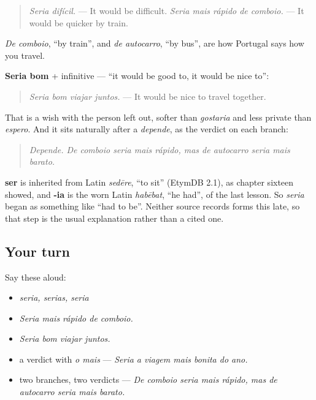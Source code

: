 \begin{quote}
\emph{Seria difícil.} — It would be difficult. \emph{Seria mais rápido de comboio.} — It would be quicker by train.
\end{quote}

\emph{De comboio}, \textquotedblleft{}by train\textquotedblright{}, and \emph{de autocarro}, \textquotedblleft{}by bus\textquotedblright{}, are how Portugal says how you travel.

\begin{grammarlens}[title={Grammar Lens: seria bom}]
\textbf{Seria bom} + infinitive — \textquotedblleft{}it would be good to, it would be nice to\textquotedblright{}:

\begin{quote}
\emph{Seria bom viajar juntos.} — It would be nice to travel together.
\end{quote}

That is a wish with the person left out, softer than \emph{gostaria} and less private than \emph{espero}. And it sits naturally after a \emph{depende}, as the verdict on each branch:

\begin{quote}
\emph{Depende. De comboio seria mais rápido, mas de autocarro seria mais barato.}
\end{quote}
\end{grammarlens}

\begin{cousinweb}
\textbf{ser} is inherited from Latin \emph{sedēre}, \textquotedblleft{}to sit\textquotedblright{} (EtymDB 2.1), as chapter sixteen showed, and \textbf{-ia} is the worn Latin \emph{habēbat}, \textquotedblleft{}he had\textquotedblright{}, of the last lesson. So \emph{seria} began as something like \textquotedblleft{}had to be\textquotedblright{}. Neither source records forms this late, so that step is the usual explanation rather than a cited one.
\end{cousinweb}

\subsection*{Your turn}
Say these aloud:

\begin{itemize}
\raggedright
  \item \emph{seria, serias, seria}
  \item \emph{Seria mais rápido de comboio.}
  \item \emph{Seria bom viajar juntos.}
  \item a verdict with \emph{o mais} — \emph{Seria a viagem mais bonita do ano.}
  \item two branches, two verdicts — \emph{De comboio seria mais rápido, mas de autocarro seria mais barato.}
\end{itemize}

